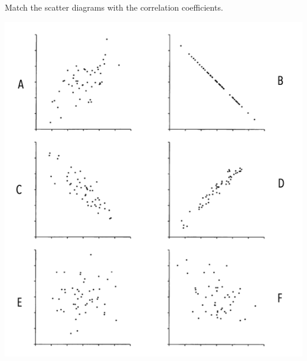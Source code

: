 \documentclass[12pt, oneside]{article}
\begin{document}
\begin{enumerate}
Match the scatter diagrams with the correlation coefficients.
\begin{center}
  \includegraphics[scale=0.5]{problem4.png}
\end{center}
\end{enumerate}
\end{document}
